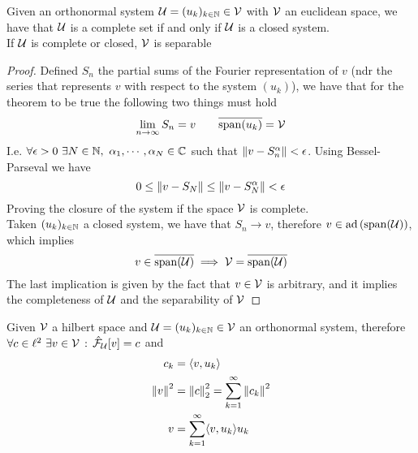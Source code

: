 \documentclass[../complete.tex]{subfiles}
\begin{document}
\begin{thm}
	Given an orthonormal system $\operatorname{\mathcal{U}}=(u_k)_{k\in\mathbb{N}}\in\mathcal{V}$ with $\mathcal{V}$ an euclidean space, we have that $\operatorname{\mathcal{U}}$ is a complete set if and only if $\operatorname{\mathcal{U}}$ is a closed system.\\
	If $\operatorname{\mathcal{U}}$ is complete or closed, $\mathcal{V}$ is separable
\end{thm}
\begin{proof}
	Defined $S_n$ the partial sums of the Fourier representation of $v$ (ndr the series that represents $v$ with respect to the system $(u_k)$), we have that for the theorem to be true the following two things must hold
	\begin{equation*}
		\lim_{n\to\infty}S_n=v\qquad\overline{\mathrm{span}{(u_k)}}=\mathcal{V}
	\end{equation*}
	I.e. $\forall\epsilon>0\ \exists N\in\N,\ \alpha_1,\cdots,\alpha_N\in\Cf$ such that $\norm{v-S_n^\alpha}<\epsilon$. Using Bessel-Parseval we have
	\begin{equation*}
		0\le\norm{v-S_N}\le\norm{v-S_N^\alpha}<\epsilon
	\end{equation*}
	Proving the closure of the system if the space $\mathcal{V}$ is complete.\\
	Taken $(u_k)_{k\in\mathbb{N}}$ a closed system, we have that $S_n\to v$, therefore $v\in\operatorname{ad}\left( \mathrm{span}(\operatorname{\mathcal{U}}) \right)$, which implies
	\begin{equation*}
		v\in\overline{\mathrm{span}(\operatorname{\mathcal{U}})}\implies\mathcal{V}=\overline{\mathrm{span}(\operatorname{\mathcal{U}})}
	\end{equation*}
	The last implication is given by the fact that $v\in\mathcal{V}$ is arbitrary, and it implies the completeness of $\operatorname{\mathcal{U}}$ and the separability of $\mathcal{V}$
\end{proof}
\begin{thm}
	Given $\mathcal{V}$ a hilbert space and $\operatorname{\mathcal{U}}=(u_k)_{k\in\mathbb{N}}\in\mathcal{V}$ an orthonormal system, therefore $\forall c\in\ell^2\ \exists v\in\mathcal{V}\, :\, \hat{\mathcal{F}}_{\operatorname{\mathcal{U}}}[v]=c$ and
	\begin{equation*}
		\begin{aligned}
			c_k&=\langle v, u_k \rangle\\
			\norm{v}^2&=\norm{c}^2_2=\sum_{k=1}^{\infty}\norm{c_k}^2\\
			v&=\sum_{k=1}^{\infty}\langle v, u_k \rangle u_k
		\end{aligned}
	\end{equation*}
\end{thm}
\end{document}
